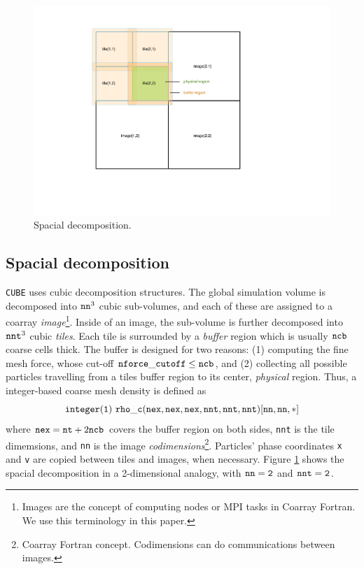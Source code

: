 \documentclass[10pt,twocolumn,preprint]{emulateapj}
\begin{document}
\begin{figure}[t]
\centering
  \includegraphics[width=0.95\linewidth]{fig_tile.pdf}
 \caption{Spacial decomposition.}
\label{fig.tile}
\end{figure}

\subsection{Spacial decomposition}
{\tt CUBE} uses cubic decomposition structures. The global simulation volume is decomposed into ${\tt nn}^3$ cubic sub-volumes, and each of these are assigned to a coarray {\it image}\footnote{Images are the concept of computing nodes or MPI tasks in Coarray Fortran. We use this terminology in this paper.}. Inside of an image, the sub-volume is further decomposed into ${\tt nnt}^3$ cubic {\it tiles}. Each tile is surrounded by a {\it buffer} region which is usually ${\tt ncb}$ coarse cells thick. The buffer is designed for two reasons: (1) computing the fine mesh force, whose cut-off ${\tt nforce\_cutoff}\leq{\tt ncb}$, and (2) collecting all possible particles travelling from a tiles buffer region to its center, {\it physical} region. Thus, a integer-based coarse mesh density is defined as
\begin{equation*}
{\tt integer(1)\ rho\_c(nex,nex,nex,nnt,nnt,nnt)[nn,nn,*]}\\
\end{equation*}
where ${\tt nex}={\tt nt}+2{\tt ncb}$ covers the buffer region on both sides, {\tt nnt} is the tile dimemsions, and {\tt nn} is the image {\it codimensions}\footnote{Coarray Fortran concept. Codimensions can do communications between images.}. Particles' phase coordinates {\tt x} and {\tt v} are copied between tiles and images, when necessary. Figure \ref{fig.tile} shows the spacial decomposition in a 2-dimensional analogy, with ${\tt nn=2}$ and ${\tt nnt=2}$.
\end{document}
